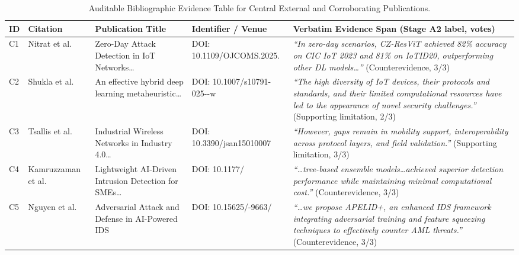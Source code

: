 \documentclass[runningheads]{llncs}
\begin{document}
\begin{table}[htbp]
\centering
\caption{Auditable Bibliographic Evidence Table for Central External and Corroborating Publications.}
\label{tab:evidence}
\tiny
\setlength{\tabcolsep}{2.5pt}
\renewcommand{\arraystretch}{0.82}
\begin{tabular}{L{0.4cm}L{1.4cm}L{2.4cm}L{2.1cm}L{4.9cm}}
\toprule
\textbf{ID} & \textbf{Citation} & \textbf{Publication Title} & \textbf{Identifier / Venue} & \textbf{Verbatim Evidence Span (Stage A2 label, votes)} \\
\midrule
C1 & Nitrat et al.~\cite{nitrat2025zeroday} & Zero-Day Attack Detection in IoT Networks\dots & DOI: 10.1109/\allowbreak OJCOMS.2025. & \emph{``In zero-day scenarios, CZ-ResViT achieved 82\% accuracy on CIC IoT 2023 and 81\% on IoTID20, outperforming other DL models\dots''} (Counterevidence, 3/3) \\
\midrule
C2 & Shukla et al.~\cite{shukla2025effective} & An effective hybrid deep learning metaheuristic\dots & DOI: 10.1007/\allowbreak s10791-025--w & \emph{``The high diversity of IoT devices, their protocols and standards, and their limited computational resources have led to the appearance of novel security challenges.''} (Supporting limitation, 2/3) \\
\midrule
C3 & Tsallis et al.~\cite{tsallis2026industrial} & Industrial Wireless Networks in Industry 4.0\dots & DOI: 10.3390/\allowbreak jsan15010007 & \emph{``However, gaps remain in mobility support, interoperability across protocol layers, and field validation.''} (Supporting limitation, 3/3) \\
\midrule
C4 & Kamruzzaman et al.~\cite{kamruzzaman2025lightweight} & Lightweight AI-Driven Intrusion Detection for SMEs\dots & DOI: 10.1177/ & \emph{``\dots tree-based ensemble models\dots achieved superior detection performance while maintaining minimal computational cost.''} (Counterevidence, 3/3) \\
\midrule
C5 & Nguyen et al.~\cite{nguyen2025adversarial} & Adversarial Attack and Defense in AI-Powered IDS & DOI: 10.15625/-9663/ & \emph{``\dots we propose APELID+, an enhanced IDS framework integrating adversarial training and feature squeezing techniques to effectively counter AML threats.''} (Counterevidence, 3/3) \\
\bottomrule
\end{tabular}
\end{table}
\end{document}
